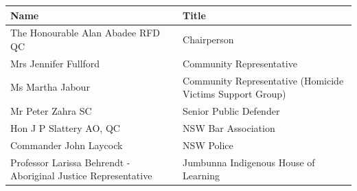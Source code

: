\documentclass{article}
\begin{document}
\begin{tabular}{ll}
\toprule
Name & Title \\
\midrule
The Honourable Alan Abadee RFD QC & Chairperson \\
Mrs Jennifer Fullford & Community Representative \\
Ms Martha Jabour & Community Representative (Homicide Victims Support Group) \\
Mr Peter Zahra SC & Senior Public Defender \\
Hon J P Slattery AO, QC & NSW Bar Association \\
Commander John Laycock & NSW Police \\
Professor Larissa Behrendt - Aboriginal Justice Representative & Jumbunna Indigenous House of Learning \\
\bottomrule
\end{tabular}
\end{document}
